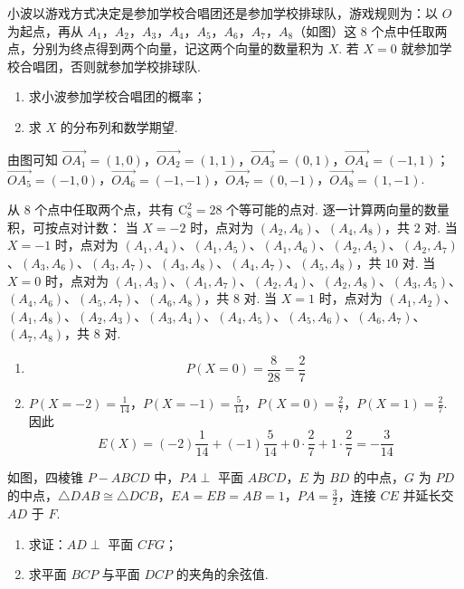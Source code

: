 \begin{problem}
小波以游戏方式决定是参加学校合唱团还是参加学校排球队，游戏规则为：以 \(O\) 为起点，再从 \(A_{1}\)，\(A_{2}\)，\(A_{3}\)，\(A_{4}\)，\(A_{5}\)，\(A_{6}\)，\(A_{7}\)，\(A_{8}\)（如图）这 8 个点中任取两点，分别为终点得到两个向量，记这两个向量的数量积为 \(X\). 若 \(X = 0\) 就参加学校合唱团，否则就参加学校排球队.

\begin{enumerate}
\item 求小波参加学校合唱团的概率；
\item 求 \(X\) 的分布列和数学期望.
\end{enumerate}

\end{problem}

\begin{solution}
由图可知 \(\overrightarrow{OA_1}=(1,0)\)，\(\overrightarrow{OA_2}=(1,1)\)，\(\overrightarrow{OA_3}=(0,1)\)，\(\overrightarrow{OA_4}=(-1,1)\)；\(\overrightarrow{OA_5}=(-1,0)\)，\(\overrightarrow{OA_6}=(-1,-1)\)，\(\overrightarrow{OA_7}=(0,-1)\)，\(\overrightarrow{OA_8}=(1,-1)\).

从 8 个点中任取两个点，共有 \(\mathrm C_8^2=28\) 个等可能的点对. 逐一计算两向量的数量积，可按点对计数：
当 \(X=-2\) 时，点对为 \((A_2,A_6)\)、\((A_4,A_8)\)，共 \(2\) 对.
当 \(X=-1\) 时，点对为 \((A_1,A_4)\)、\((A_1,A_5)\)、\((A_1,A_6)\)、\((A_2,A_5)\)、\((A_2,A_7)\)、\((A_3,A_6)\)、\((A_3,A_7)\)、\((A_3,A_8)\)、\((A_4,A_7)\)、\((A_5,A_8)\)，共 \(10\) 对.
当 \(X=0\) 时，点对为 \((A_1,A_3)\)、\((A_1,A_7)\)、\((A_2,A_4)\)、\((A_2,A_8)\)、\((A_3,A_5)\)、\((A_4,A_6)\)、\((A_5,A_7)\)、\((A_6,A_8)\)，共 \(8\) 对.
当 \(X=1\) 时，点对为 \((A_1,A_2)\)、\((A_1,A_8)\)、\((A_2,A_3)\)、\((A_3,A_4)\)、\((A_4,A_5)\)、\((A_5,A_6)\)、\((A_6,A_7)\)、\((A_7,A_8)\)，共 \(8\) 对.

\begin{enumerate}
\item
\[
P(X=0)=\frac8{28}=\frac27
\]

\item
\(P(X=-2)=\frac1{14}\)，\(P(X=-1)=\frac5{14}\)，\(P(X=0)=\frac27\)，\(P(X=1)=\frac27\).
因此
\[
E(X)=(-2)\frac1{14}+(-1)\frac5{14}
+0\cdot\frac27+1\cdot\frac27
=-\frac3{14}
\]
\end{enumerate}
\end{solution}

\begin{problem}
如图，四棱锥 \(P - ABCD\) 中，\(PA \perp\) 平面 \(ABCD\)，\(E\) 为 \(BD\) 的中点，\(G\) 为 \(PD\) 的中点，\(\triangle DAB \cong \triangle DCB\)，\(EA = EB = AB = 1\)，\(PA = \frac{3}{2}\)，连接 \(CE\) 并延长交 \(AD\) 于 \(F\).

\begin{enumerate}
\item 求证：\(AD \perp\) 平面 \(CFG\)；
\item 求平面 \(BCP\) 与平面 \(DCP\) 的夹角的余弦值.
\end{enumerate}

\end{problem}

